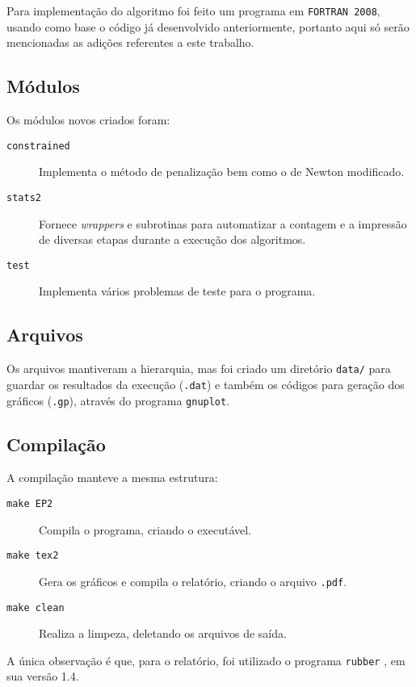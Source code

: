 Para implementação do algoritmo foi feito um programa em \texttt{FORTRAN 2008},
usando como base o código já desenvolvido anteriormente, portanto aqui só serão
mencionadas as adições referentes a este trabalho.

\subsection{Módulos}
    Os módulos novos criados foram:

    \begin{description}
        \item[\texttt{constrained}] Implementa o método de penalização bem como o de Newton modificado.
        \item[\texttt{stats2}] Fornece \emph{wrappers} e subrotinas para automatizar a contagem e a impressão de diversas etapas durante a execução dos algoritmos.
        \item[\texttt{test}]  Implementa vários problemas de teste para o programa.
    \end{description}

\subsection{Arquivos}
    Os arquivos mantiveram a hierarquia, mas foi criado um diretório \texttt{data/}
    para guardar os resultados da execução (\texttt{.dat}) e também os códigos para geração dos
    gráficos (\texttt{.gp}), através do programa \texttt{gnuplot}.

\subsection{Compilação}
    A compilação manteve a mesma estrutura:
    \begin{description}
        \item[\texttt{make EP2}] Compila o programa, criando o executável.
        \item[\texttt{make tex2}] Gera os gráficos e compila o relatório, criando o arquivo \texttt{.pdf}.
        \item[\texttt{make clean}] Realiza a limpeza, deletando os arquivos de saída.
    \end{description}

    A única observação é que, para o relatório, foi utilizado o programa \texttt{rubber} \citep{web:rubber},
    em sua versão 1.4.
